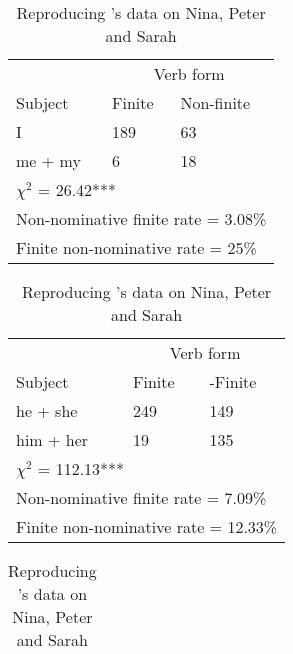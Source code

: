 \FloatBarrier
\begin{table}[!h]
    \caption{Reproducing \cite{schutze1997}'s data on Nina, Peter and Sarah}
    \label{tab:ATOMSchutze}
   \begin{minipage}[t]{0.5\textwidth}
    \centering
    \small
    \begin{tabular}{@{}lll@{}}
        \toprule
         & \multicolumn{2}{c}{Verb form}\\
         \cline{2-3}
        Subject & Finite & Non-finite \\
        \midrule
        I & 189 & 63  \\
        me + my  & 6 & 18 \\
        \hline
        \multicolumn{3}{l}{$\chi^2$ = 26.42***} \\
         \multicolumn{3}{l}{Non-nominative finite rate = 3.08\%} \\
         \multicolumn{3}{l}{Finite non-nominative rate = 25\%}\\
        \bottomrule
    \end{tabular}
\end{minipage}
\vspace{1ex}
\begin{minipage}[t]{0.5\textwidth}
    \centering
    \small
    \begin{tabular}{@{}lll@{}}
        \toprule
         & \multicolumn{2}{c}{Verb form}\\
         \cline{2-3}
        Subject & Finite & -Finite \\
        \midrule
        he + she & 249 & 149 \\
        him + her & 19 & 135 \\
        \hline
        \multicolumn{3}{l}{$\chi^2$ = 112.13***}\\
         \multicolumn{3}{l}{Non-nominative finite rate = 7.09\%} \\\multicolumn{3}{l}{Finite non-nominative rate = 12.33\%}\\
    \bottomrule
    \end{tabular}
    \end{minipage}
\vspace{1ex}
    \begin{minipage}[t]{0.5\textwidth}
    \centering
    \small
    \begin{tabular}{lllll}

\end{tabular}
\end{minipage}
\end{table}
